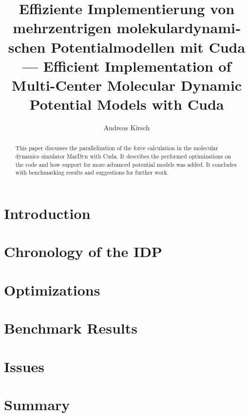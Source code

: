 \documentclass[11pt,a4paper,onecolumn,notitlepage]{scrartcl}
\author{Andreas Kirsch}
\title{\foreignlanguage{ngerman}{Effiziente Implementierung von mehrzentrigen molekulardynamischen Potentialmodellen mit Cuda} \linebreak --- \linebreak Efficient Implementation of Multi-Center Molecular Dynamic Potential Models with Cuda}
\newcommand{\cuda}{Cuda}
\begin{document}
\maketitle

\begin{abstract}
This paper discusses the parallelization of the force calculation in the molecular dynamics simulator MarDyn with \cuda. It describes the performed optimizations on the code and how support for more advanced potential models was added. It concludes with benchmarking results and suggestions for further work.
\end{abstract}

\section{Introduction}

%

\section{Chronology of the IDP}

%


%

\section{Optimizations}



\section{Benchmark Results}



\section{Issues}

\section{Summary}
\end{document}
